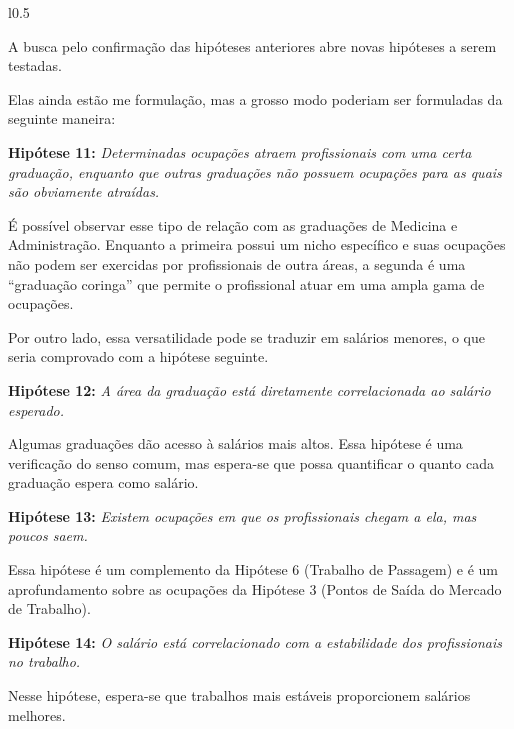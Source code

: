 \documentclass[10pt,a4paper,final]{article}
\begin{document}
\begin{minipage}[t]{\linewidth}
  \begin{wrapfigure}{l}{0.5\textwidth}
  \end{wrapfigure}
  
  A busca pelo confirmação das hipóteses anteriores abre novas hipóteses a serem testadas.
  
  Elas ainda estão me formulação, mas a grosso modo poderiam ser formuladas da seguinte maneira:
  
  \textbf{Hipótese 11:} \textit{Determinadas ocupações atraem profissionais com uma certa graduação, enquanto que outras graduações não possuem ocupações para as quais são obviamente atraídas.}
  
  É possível observar esse tipo de relação com as graduações de Medicina e Administração. Enquanto a primeira possui um nicho específico e suas ocupações não podem ser exercidas por profissionais de outra áreas, a segunda é uma \enquote{graduação coringa} que permite o profissional atuar em uma ampla gama de ocupações.
  
  Por outro lado, essa versatilidade pode se traduzir em salários menores, o que seria comprovado com a hipótese seguinte.
  
  \textbf{Hipótese 12:} \textit{A área da graduação está diretamente correlacionada ao salário esperado.}
  
  Algumas graduações dão acesso à salários mais altos. Essa hipótese é uma verificação do senso comum, mas espera-se que possa quantificar o quanto cada graduação espera como salário.
  
  \textbf{Hipótese 13:} \textit{Existem ocupações em que os profissionais chegam a ela, mas poucos saem.}
  
  Essa hipótese é um complemento da Hipótese 6 (Trabalho de Passagem) e é um aprofundamento sobre as ocupações da Hipótese 3 (Pontos de Saída do Mercado de Trabalho).
  
  \textbf{Hipótese 14:} \textit{O salário está correlacionado com a estabilidade dos profissionais no trabalho.}
  
  Nesse hipótese, espera-se que trabalhos mais estáveis proporcionem salários melhores.
\end{minipage}

\newpage

\def\refname{REFERÊNCIAS BIBLIOGRÁFICAS}


\end{document}
